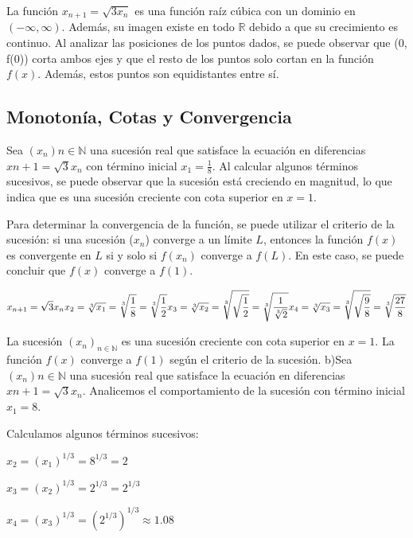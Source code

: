 \documentclass{article}
\begin{document}
La función $x_{n + 1} = \sqrt{3x_n}$ es una función raíz cúbica con un dominio en $(-\infty , \infty)$. Además, su imagen existe en todo $\mathbb{R}$ debido a que su crecimiento es continuo. Al analizar las posiciones de los puntos dados, se puede observar que (0, f(0)) corta ambos ejes y que el resto de los puntos solo cortan en la función $f(x)$. Además, estos puntos son equidistantes entre sí.

    \subsection{Monotonía, Cotas y Convergencia}

Sea $(x_n){n \in \mathbb{N}}$ una sucesión real que satisface la ecuación en diferencias $x{n+1} = \sqrt{3}x_n$ con término inicial $x_1 = \frac{1}{8}$. Al calcular algunos términos sucesivos, se puede observar que la sucesión está creciendo en magnitud, lo que indica que es una sucesión creciente con cota superior en $x = 1$.

Para determinar la convergencia de la función, se puede utilizar el criterio de la sucesión: si una sucesión ($x_{n}$) converge a un límite $L$, entonces la función $f(x)$ es convergente en $L$ si y solo si $f(x_{n})$ converge a $f(L)$. En este caso, se puede concluir que $f(x)$ converge a $f(1)$.

\begin{equation}
    x_{n+1} = \sqrt{3}x_n \\
    x_2 = \sqrt[3]{x_1} = \sqrt[3]{\frac{1}{8}} = \sqrt[3]{\frac{1}{2}} \\
    x_3 = \sqrt[3]{x_2} = \sqrt[3]{\sqrt{\frac{1}{2}}} = \sqrt[3]{\frac{1}{\sqrt[3]{2}}} \\
    x_4 = \sqrt[3]{x_3} = \sqrt[3]{\sqrt{\frac{9}{8}}} = \sqrt[3]{\frac{27}{8}}
\end{equation}

La sucesión $(x_n)_{n \in \mathbb{N}}$ es una sucesión creciente con cota superior en $x = 1$. La función $f(x)$ converge a $f(1)$ según el criterio de la sucesión.
b)Sea $(x_n){n \in \mathbb{N}}$ una sucesión real que satisface la ecuación en diferencias $x{n+1} = \sqrt{3}x_n$. Analicemos el comportamiento de la sucesión con término inicial $x_1 = 8$.

Calculamos algunos términos sucesivos:

$x_2 = (x_1)^{1/3} = 8^{1/3} = 2$

$x_3 = (x_2)^{1/3} = 2^{1/3} = 2^{1/3}$

$x_4 = (x_3)^{1/3} = (2^{1/3})^{1/3} \approx 1.08$
\end{document}
